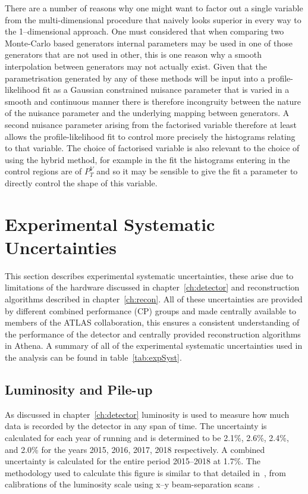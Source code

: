 There are a number of reasons why one might want to factor out a single variable
from the multi-dimensional procedure that naively looks superior in every way to
the 1--dimensional approach. One must considered that when comparing two
Monte-Carlo based generators internal parameters may be used in one of those
generators that are not used in other, this is one reason why a smooth
interpolation between generators may not actually exist. Given that the
parametrisation generated by any of these methods will be input into a
profile-likelihood fit as a Gaussian constrained nuisance parameter that is
varied in a smooth and continuous manner there is therefore incongruity between
the nature of the nuisance parameter and the underlying mapping between
generators. A second nuisance parameter arising from the factorised variable
therefore at least allows the profile-likelihood fit to control more precisely
the histograms relating to that variable. The choice of factorised variable is
also relevant to the choice of using the hybrid method, for example in the fit
the histograms entering in the control regions are of $P_T^V$ and so it may be
sensible to give the fit a parameter to directly control the shape of this
variable.

\section{Experimental Systematic Uncertainties}

This section describes experimental systematic uncertainties, these arise due to
limitations of the hardware discussed in chapter~\ref{ch:detector} and
reconstruction algorithms described in chapter~\ref{ch:recon}. All of these
uncertainties are provided by different combined performance (CP) groups and
made centrally available to members of the ATLAS collaboration, this ensures a
consistent understanding of the performance of the detector and centrally
provided reconstruction algorithms in Athena. A summary of all of the
experimental systematic uncertainties used in the analysis can be found in
table~\ref{tab:expSyst}.


\subsection{Luminosity and Pile-up}
\label{sec:lumisys}

As discussed in chapter~\ref{ch:detector} luminosity is used to measure how much
data is recorded by the detector in any span of time. The uncertainty is
calculated for each year of running and is determined to be  2.1\%, 2.6\%,
2.4\%, and 2.0\% for the years 2015, 2016, 2017, 2018 respectively. A combined
uncertainty is calculated for the entire period 2015--2018 at 1.7\%. The
methodology used to calculate this figure is similar to that detailed
in~\cite{lumiDetermine}, from calibrations of the luminosity scale using x--y
beam-separation scans~\cite{lumiTwiki}.

